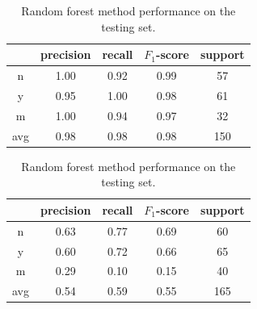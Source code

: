 \documentclass[11pt]{article}
\begin{document}
\begin{table}
  \centering
  \begin{tabular}[!htbp]{c|c c c c}
       & precision &recall &$F_1$-score &support \\ \hline
    n  & 1.00      &0.92   &0.99     &57      \\
    y  & 0.95      &1.00   &0.98     &61      \\
    m  & 1.00      &0.94   &0.97     &32      \\ \hline
    avg& 0.98      &0.98   &0.98     &150     \\
  \end{tabular}
  \caption{Reconstructing the training set with random forest classification method.}

  \begin{tabular}[!htbp]{c|c c c c}
       & precision &recall &$F_1$-score &support \\ \hline
    n  & 0.63      &0.77   &0.69     &60      \\
    y  & 0.60      &0.72   &0.66     &65      \\
    m  & 0.29      &0.10   &0.15     &40      \\ \hline
    avg& 0.54      &0.59   &0.55     &165     \\
  \end{tabular}
  \caption{Random forest method performance on the testing set.}
\end{table}
\end{document}
